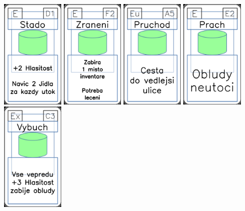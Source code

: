 \documentclass[a4paper]{article}
\begin{document}
	\includegraphics[width=3.0cm]{img-4_45}
	\includegraphics[width=3.0cm]{img-4_56}
	\includegraphics[width=3.0cm]{img-4_34}
	\includegraphics[width=3.0cm]{img-4_51}
	\includegraphics[width=3.0cm]{img-4_12}
\end{document}
